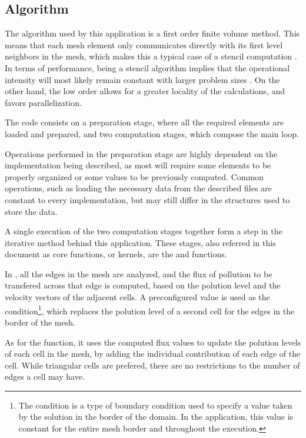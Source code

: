 \subsection{Algorithm}
\label{sec:210}


The algorithm used by this application is a first order finite volume method. This means that each mesh element only communicates directly with its first level neighbors in the mesh, which makes this a typical case of a stencil computation \cite{mitlab3}. In terms of performance, being a stencil algorithm implies that the operational intensity will most likely remain constant with larger problem sizes \cite{williams2008,parlab2008}. On the other hand, the low order allows for a greater locality of the calculations, and favors parallelization.

The code consists on a preparation stage, where all the required elements are loaded and prepared, and two computation stages, which compose the main loop.

Operations performed in the preparation stage are highly dependent on the implementation being described, as most will require some elements to be properly organized or some values to be previously computed. Common operations, such as loading the necessary data from the described files are constant to every implementation, but may still differ in the structures used to store the data.

A single execution of the two computation stages together form a step in the iterative method behind this application. These stages, also referred in this document as core functions, or kernels, are the \computeflux and \update functions.

In \computeflux, all the edges in the mesh are analyzed, and the flux of pollution to be transfered across that edge is computed, based on the polution level and the velocity vectors of the adjacent cells. A preconfigured value is used as the \dirichlet condition\footnote{The \dirichlet condition is a type of boundary condition used to specify a value taken by the solution in the border of the domain. In the \polu application, this value is constant for the entire mesh border and throughout the execution.}, which replaces the polution level of a second cell for the edges in the border of the mesh.

As for the \update function, it uses the computed flux values to update the polution levels of each cell in the mesh, by adding the individual contribution of each edge of the cell. While triangular cells are prefered, there are no restrictions to the number of edges a cell may have.
